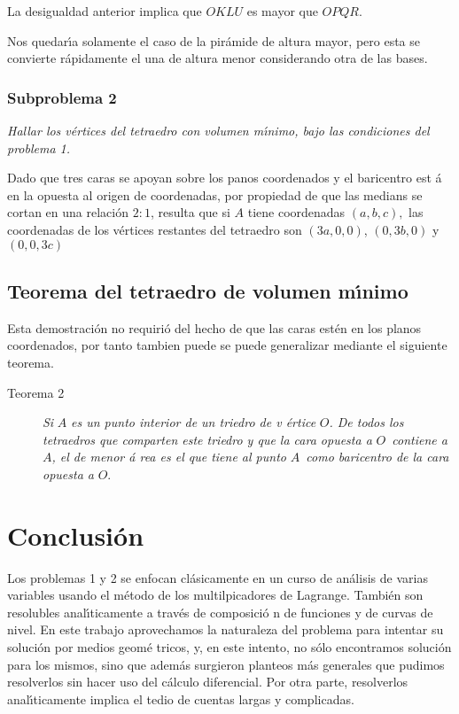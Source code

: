 \documentclass[a4paper,spanish]{article}
\begin{document}
La desigualdad anterior implica que $OKLU$ es mayor que $OPQR$.

Nos quedar\'{\i}a solamente el caso de la pir\'{a}mide de altura mayor, pero
esta se convierte r\'{a}pidamente el una de altura menor considerando otra
de las bases.

\subsubsection{Subproblema 2}

\emph{Hallar los v\'{e}rtices del tetraedro con volumen m\'{\i}nimo, bajo
las condiciones del problema 1.}

Dado que tres caras se apoyan sobre los panos coordenados y el baricentro est%
\'{a} en la opuesta al origen de coordenadas, por propiedad de que las
medians se cortan en una relaci\'{o}n $2:1$, resulta que si $A$ tiene
coordenadas $\left( a,b,c\right) ,$ las coordenadas de los v\'{e}rtices
restantes del tetraedro son $\left( 3a,0,0\right) $, $\left( 0,3b,0\right) $
y $\left( 0,0,3c\right) $

\subsection{Teorema del tetraedro de volumen m\'{\i}nimo}

Esta demostraci\'{o}n no requiri\'{o} del hecho de que las caras est\'{e}n
en los planos coordenados, por tanto tambien puede se puede generalizar
mediante el siguiente teorema.

\begin{description}
\item[Teorema 2] \emph{Si }$A$ \emph{es un punto interior de un triedro de v%
\'{e}rtice }$O$\emph{. De todos los tetraedros que comparten este triedro y
que la cara opuesta a }$O$\emph{\ contiene a }$A$\emph{, el de menor \'{a}%
rea es el que tiene al punto }$A$\emph{\ como baricentro de la cara opuesta
a }$O.$
\end{description}

\section{Conclusi\'{o}n}

Los problemas 1 y 2 se enfocan cl\'{a}sicamente en un curso de an\'{a}lisis
de varias variables usando el m\'{e}todo de los multilpicadores de Lagrange.
Tambi\'{e}n son resolubles anal\'{\i}ticamente a trav\'{e}s de composici\'{o}%
n de funciones y de curvas de nivel. En este trabajo aprovechamos la
naturaleza del problema para intentar su soluci\'{o}n por medios geom\'{e}%
tricos, y, en este intento, no s\'{o}lo encontramos soluci\'{o}n para los
mismos, sino que adem\'{a}s surgieron planteos m\'{a}s generales que pudimos
resolverlos sin hacer uso del c\'{a}lculo diferencial. Por otra parte,
resolverlos anal\'{\i}ticamente implica el tedio de cuentas largas y
complicadas.
\end{document}
